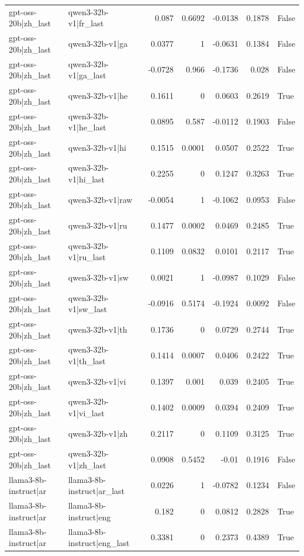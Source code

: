 \begin{table}
\begin{tabular}{l l r r r r l}
gpt-oss-20b|zh_last & qwen3-32b-v1|fr_last & 0.087 & 0.6692 & -0.0138 & 0.1878 & False \\
gpt-oss-20b|zh_last & qwen3-32b-v1|ga & 0.0377 & 1 & -0.0631 & 0.1384 & False \\
gpt-oss-20b|zh_last & qwen3-32b-v1|ga_last & -0.0728 & 0.966 & -0.1736 & 0.028 & False \\
gpt-oss-20b|zh_last & qwen3-32b-v1|he & 0.1611 & 0 & 0.0603 & 0.2619 & True \\
gpt-oss-20b|zh_last & qwen3-32b-v1|he_last & 0.0895 & 0.587 & -0.0112 & 0.1903 & False \\
gpt-oss-20b|zh_last & qwen3-32b-v1|hi & 0.1515 & 0.0001 & 0.0507 & 0.2522 & True \\
gpt-oss-20b|zh_last & qwen3-32b-v1|hi_last & 0.2255 & 0 & 0.1247 & 0.3263 & True \\
gpt-oss-20b|zh_last & qwen3-32b-v1|raw & -0.0054 & 1 & -0.1062 & 0.0953 & False \\
gpt-oss-20b|zh_last & qwen3-32b-v1|ru & 0.1477 & 0.0002 & 0.0469 & 0.2485 & True \\
gpt-oss-20b|zh_last & qwen3-32b-v1|ru_last & 0.1109 & 0.0832 & 0.0101 & 0.2117 & True \\
gpt-oss-20b|zh_last & qwen3-32b-v1|sw & 0.0021 & 1 & -0.0987 & 0.1029 & False \\
gpt-oss-20b|zh_last & qwen3-32b-v1|sw_last & -0.0916 & 0.5174 & -0.1924 & 0.0092 & False \\
gpt-oss-20b|zh_last & qwen3-32b-v1|th & 0.1736 & 0 & 0.0729 & 0.2744 & True \\
gpt-oss-20b|zh_last & qwen3-32b-v1|th_last & 0.1414 & 0.0007 & 0.0406 & 0.2422 & True \\
gpt-oss-20b|zh_last & qwen3-32b-v1|vi & 0.1397 & 0.001 & 0.039 & 0.2405 & True \\
gpt-oss-20b|zh_last & qwen3-32b-v1|vi_last & 0.1402 & 0.0009 & 0.0394 & 0.2409 & True \\
gpt-oss-20b|zh_last & qwen3-32b-v1|zh & 0.2117 & 0 & 0.1109 & 0.3125 & True \\
gpt-oss-20b|zh_last & qwen3-32b-v1|zh_last & 0.0908 & 0.5452 & -0.01 & 0.1916 & False \\
llama3-8b-instruct|ar & llama3-8b-instruct|ar_last & 0.0226 & 1 & -0.0782 & 0.1234 & False \\
llama3-8b-instruct|ar & llama3-8b-instruct|eng & 0.182 & 0 & 0.0812 & 0.2828 & True \\
llama3-8b-instruct|ar & llama3-8b-instruct|eng_last & 0.3381 & 0 & 0.2373 & 0.4389 & True \\

\end{tabular}
\end{table}
